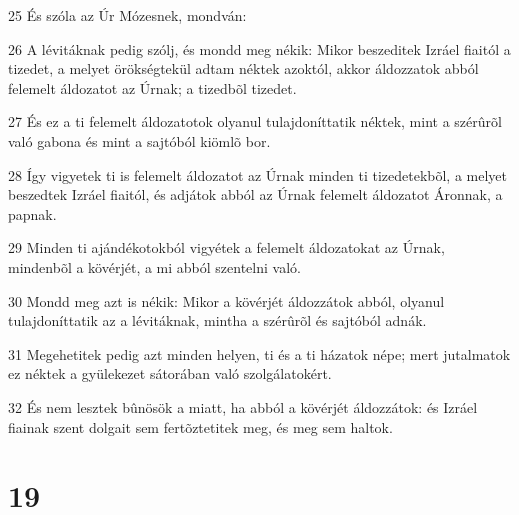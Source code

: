\par 25 És szóla az Úr Mózesnek, mondván:
\par 26 A lévitáknak pedig szólj, és mondd meg nékik: Mikor beszeditek Izráel fiaitól a tizedet, a melyet örökségtekül adtam néktek azoktól, akkor áldozzatok abból felemelt áldozatot az Úrnak; a tizedbõl tizedet.
\par 27 És ez a ti felemelt áldozatotok olyanul tulajdoníttatik néktek, mint a szérûrõl való gabona és mint a sajtóból kiömlõ bor.
\par 28 Így vigyetek ti is felemelt áldozatot az Úrnak minden ti tizedetekbõl, a melyet beszedtek Izráel fiaitól, és adjátok abból az Úrnak felemelt áldozatot Áronnak, a papnak.
\par 29 Minden ti ajándékotokból vigyétek a felemelt áldozatokat az Úrnak, mindenbõl a kövérjét, a mi abból szentelni való.
\par 30 Mondd meg azt is nékik: Mikor a kövérjét áldozzátok abból, olyanul tulajdoníttatik az a lévitáknak, mintha a szérûrõl és sajtóból adnák.
\par 31 Megehetitek pedig azt minden helyen, ti és a ti házatok népe; mert jutalmatok ez néktek a gyülekezet sátorában való szolgálatokért.
\par 32 És nem lesztek bûnösök a miatt, ha abból a kövérjét áldozzátok: és Izráel fiainak szent dolgait sem fertõztetitek meg, és meg sem haltok.

\chapter{19}

